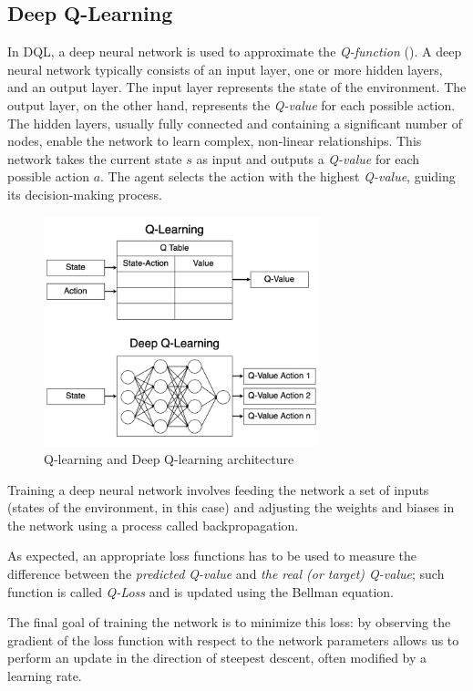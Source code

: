 \documentclass[12pt,a4paper,openright,twoside]{book}
\begin{document}
\subsection{Deep Q-Learning}

In DQL, a deep neural network is used to approximate the \emph{Q-function} (). A deep neural network typically consists of an input layer, one or more hidden layers, and an output layer. The input layer represents the state of the environment. The output layer, on the other hand, represents the \emph{Q-value} for each possible action. The hidden layers, usually fully connected and containing a significant number of nodes, enable the network to learn complex, non-linear relationships.
This network takes the current state $s$ as input and outputs a \emph{Q-value} for each possible action $a$. The agent selects the action with the highest \emph{Q-value}, guiding its decision-making process.
\begin{figure}
    \centering
    \includegraphics[width=8cm]{img/dql.png}
    \caption{Q-learning and Deep Q-learning architecture}
    \label{fig:k}
\end{figure}

Training a deep neural network involves feeding the network a set of inputs (states of the environment, in this case) and adjusting the weights and biases in the network using a process called backpropagation.

As expected, an appropriate loss functions has to be used to measure the difference between the \emph{predicted Q-value} and \emph{the real (or target) Q-value}; such function is called \emph{Q-Loss} and is updated using the Bellman equation. 

The final goal of training the network is to minimize this loss: by observing the gradient of the loss function with respect to the network parameters allows us to perform an update in the direction of steepest descent, often modified by a learning rate. 
\end{document}

